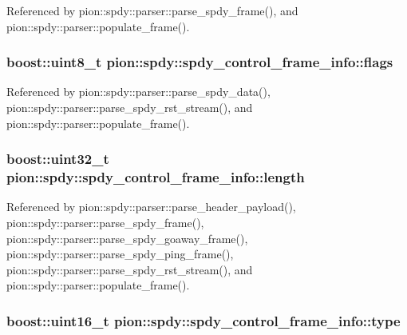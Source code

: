 Referenced by pion\-::spdy\-::parser\-::parse\-\_\-spdy\-\_\-frame(), and pion\-::spdy\-::parser\-::populate\-\_\-frame().

\hypertarget{structpion_1_1spdy_1_1spdy__control__frame__info_a29431bbcacc702fe6e24ad5f0c11e6b4}{
\subsubsection[{flags}]{\setlength{\rightskip}{0pt plus 5cm}boost\-::uint8\-\_\-t pion\-::spdy\-::spdy\-\_\-control\-\_\-frame\-\_\-info\-::flags}}\label{structpion_1_1spdy_1_1spdy__control__frame__info_a29431bbcacc702fe6e24ad5f0c11e6b4}


Referenced by pion\-::spdy\-::parser\-::parse\-\_\-spdy\-\_\-data(), pion\-::spdy\-::parser\-::parse\-\_\-spdy\-\_\-rst\-\_\-stream(), and pion\-::spdy\-::parser\-::populate\-\_\-frame().

\hypertarget{structpion_1_1spdy_1_1spdy__control__frame__info_aae971220edc8d59da5e7b7018e2c7e6d}{
\subsubsection[{length}]{\setlength{\rightskip}{0pt plus 5cm}boost\-::uint32\-\_\-t pion\-::spdy\-::spdy\-\_\-control\-\_\-frame\-\_\-info\-::length}}\label{structpion_1_1spdy_1_1spdy__control__frame__info_aae971220edc8d59da5e7b7018e2c7e6d}


Referenced by pion\-::spdy\-::parser\-::parse\-\_\-header\-\_\-payload(), pion\-::spdy\-::parser\-::parse\-\_\-spdy\-\_\-frame(), pion\-::spdy\-::parser\-::parse\-\_\-spdy\-\_\-goaway\-\_\-frame(), pion\-::spdy\-::parser\-::parse\-\_\-spdy\-\_\-ping\-\_\-frame(), pion\-::spdy\-::parser\-::parse\-\_\-spdy\-\_\-rst\-\_\-stream(), and pion\-::spdy\-::parser\-::populate\-\_\-frame().

\hypertarget{structpion_1_1spdy_1_1spdy__control__frame__info_ac5dcfbebbe23ff86c277c93f6463020c}{
\subsubsection[{type}]{\setlength{\rightskip}{0pt plus 5cm}boost\-::uint16\-\_\-t pion\-::spdy\-::spdy\-\_\-control\-\_\-frame\-\_\-info\-::type}}\label{structpion_1_1spdy_1_1spdy__control__frame__info_ac5dcfbebbe23ff86c277c93f6463020c}



